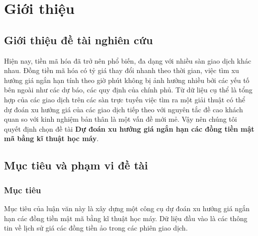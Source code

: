 \chapter{Giới thiệu} \label{chap-Intro}
\section{Giới thiệu đề tài nghiên cứu}
Hiện nay, tiền mã hóa đã trở nên phổ biến, đa dạng với nhiều sàn giao dịch khác nhau. Đồng tiền mã hóa có tỷ giá thay đổi nhanh theo thời gian, việc tìm xu hướng giá ngắn hạn tính theo giờ phút không bị ảnh hưởng nhiều bởi các yếu tố bên ngoài như các dự báo, các quy định của chính phủ. Từ dữ liệu cụ thể là tổng hợp của các giao dịch trên các sàn trực tuyến việc tìm ra một giải thuật có thể dự đoán xu hướng giá của các giao dịch tiếp theo với nguyên tắc đề cao khách quan so với kinh nghiệm bản thân là một vấn đề mới mẻ. Vậy nên chúng tôi quyết định chọn đề tài \textbf{Dự đoán xu hướng giá ngắn hạn các đồng tiền mật mã bằng kĩ thuật học máy}.
\section{Mục tiêu và phạm vi đề tài}
\subsection{Mục tiêu}
Mục tiêu của luận văn này là xây dựng một công cụ dự đoán xu hướng giá ngắn hạn các đồng tiền mật mã bằng kĩ thuật học máy. Dữ liệu đầu vào là các thông tin về lịch sử giá các  đồng tiền ảo trong các phiên giao dịch.

